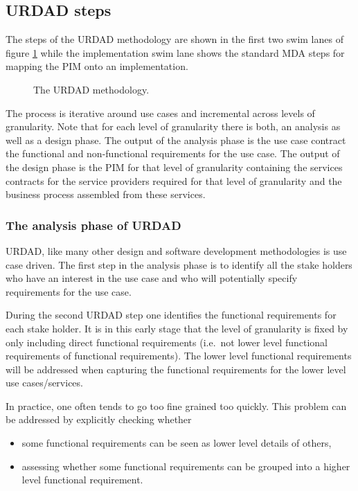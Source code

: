 
\subsection{URDAD steps}

The steps of the URDAD methodology are shown in the first two swim lanes of
figure \ref{fig:methodology} while the implementation swim lane shows the
standard MDA steps for mapping the PIM onto an implementation.

\begin{figure}
  \centering
  \caption{The URDAD methodology.}
  \label{fig:methodology}
\end{figure}

The process is iterative around use cases and incremental across levels of
granularity. Note that for each level of granularity there is both, an analysis
as well as a design phase. The output of the analysis phase is the use
case contract the functional and non-functional requirements for the use
case. The output of the design phase is the PIM for that level of
granularity containing the services contracts for the service providers
required for that level of granularity and the business process assembled
from these services.


\subsubsection{The analysis phase of URDAD}

URDAD, like many other design and software development methodologies is use
case driven. The first step in the analysis phase is to identify
all the stake holders who have an interest in the use case and who will
potentially specify requirements for the use case.

During the second URDAD step one identifies the functional requirements for each stake
holder. It is in this early stage that the level of granularity is fixed by only including
direct functional requirements (i.e.\ not lower level functional requirements of functional
requirements). The lower level functional requirements will be addressed when capturing
the functional requirements for the lower level use cases/services.

In practice, one often tends to go too fine grained too quickly. This problem can be addressed
by explicitly checking whether
\begin{itemize}
  \item some functional requirements can be seen as lower level details of others,
  \item assessing whether some functional requirements can be grouped into a higher
			level functional requirement.
\end{itemize}

